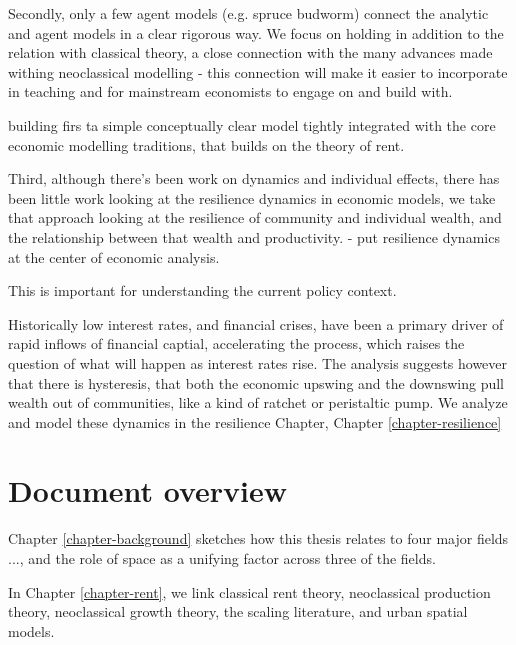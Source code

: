 Secondly, only a few agent models (e.g. spruce budworm) connect the analytic and agent models in a clear rigorous way. We focus on holding in addition to the relation with classical theory, a close connection with the many advances made withing neoclassical modelling - this connection will make it easier to incorporate in teaching and for mainstream economists to engage on and build with.


building firs ta simple conceptually clear model tightly integrated with the core economic modelling traditions, that builds on the theory of rent.


Third, although there's been work on dynamics and individual effects, there has been little work looking at the resilience dynamics in economic models, we take that approach looking at the resilience of community and individual wealth, and the relationship between that wealth and productivity. - put resilience dynamics at the center of economic analysis.

This is important for understanding the current policy context. 

Historically low interest rates, and financial crises, have been a primary driver of rapid inflows of financial captial, accelerating the process, which raises the question of what will happen as interest rates rise. The analysis suggests however that there is hysteresis, that both the economic upswing and the downswing pull wealth out of communities, like a kind of ratchet or peristaltic pump. We analyze and model these dynamics in the resilience Chapter, Chapter \ref{chapter-resilience}






\section{Document overview}

Chapter \ref{chapter-background} sketches how this thesis relates to four major fields ..., and the role of space as a unifying factor across three of the fields.

In Chapter \ref{chapter-rent}, we link classical rent theory, neoclassical production theory, neoclassical growth theory, the scaling literature, and urban spatial models.

